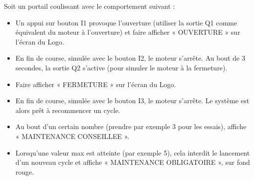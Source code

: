 \documentclass[11pt]{article}
\begin{document}
Soit un portail coulissant avec le comportement suivant : 
\begin{itemize}
    \item Un appui sur bouton I1 provoque l’ouverture (utiliser la sortie Q1 comme équivalent du moteur à l’ouverture) et faire afficher « OUVERTURE » sur l’écran du Logo.
    \item En fin de course, simulée avec le bouton I2, le moteur s’arrête.
    Au bout de 3 secondes, la sortie Q2 s’active (pour simuler le moteur à la fermeture).
    \item Faire afficher « FERMETURE » sur l’écran du Logo.
    \item En fin de course, simulée avec le bouton I3, le moteur s’arrête.
    Le système est alors prêt à recommencer un cycle.
\end{itemize}
\begin{UPSTIactivite}
    
    
    \begin{itemize}
        \item Au bout d’un certain nombre (prendre par exemple 3 pour les essais), affiche « MAINTENANCE CONSEILLEE ». 
        \item Lorsqu’une valeur max est atteinte
        (par exemple 5), cela interdit le lancement d’un nouveau cycle et affiche « MAINTENANCE
        OBLIGATOIRE », sur fond rouge.
    \end{itemize}
    
\end{UPSTIactivite}
\end{document}
